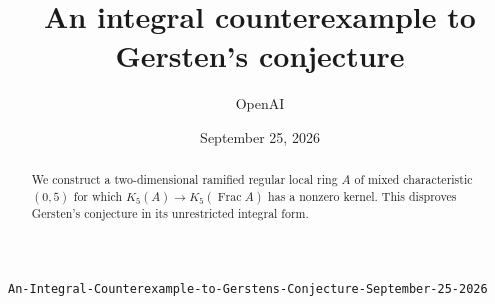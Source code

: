 \documentclass[11pt]{article}
\title{An integral counterexample to Gersten's conjecture}
\author{OpenAI}
\date{September 25, 2026}
\theoremstyle{remark}
\DeclareMathOperator{\Frac}{Frac}
\numberwithin{equation}{section}
\begin{document}
\maketitle
\begin{center}\small\nolinkurl{An-Integral-Counterexample-to-Gerstens-Conjecture-September-25-2026}\end{center}
\begin{abstract}
We construct a two-dimensional ramified regular local ring $A$ of mixed
characteristic $(0,5)$ for which $K_5(A)\to K_5(\Frac A)$ has a nonzero
kernel. This disproves Gersten's conjecture in its unrestricted integral
form.
\end{abstract}








\appendix




\end{document}
